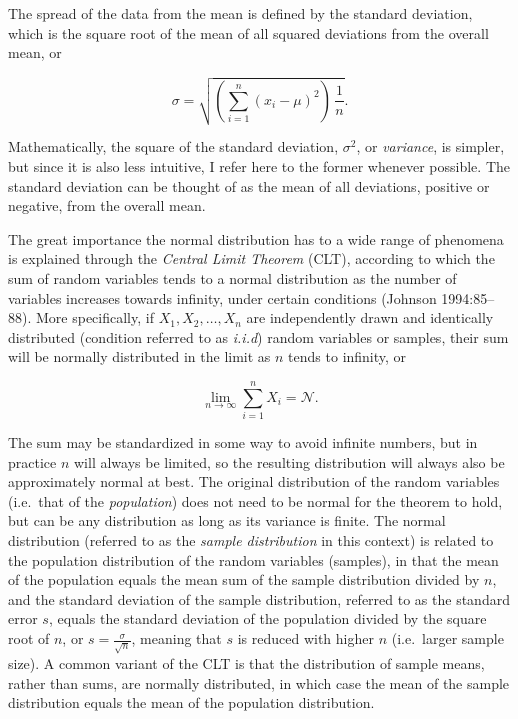 \documentclass[
  12pt,
]{book}
\begin{document}
The spread of the data from the mean is defined by the standard deviation, which is the square root of the mean of all squared deviations from the overall mean, or

\begin{equation}
\sigma = \sqrt{(\sum_{i=1}^n(x_i-\mu)^2)\,\frac{1}{n}}.
\label{eq:sigma}
\end{equation}

Mathematically, the square of the standard deviation, \(\sigma^2\), or \emph{variance}, is simpler, but since it is also less intuitive, I refer here to the former whenever possible. The standard deviation can be thought of as the mean of all deviations, positive or negative, from the overall mean.

The great importance the normal distribution has to a wide range of phenomena is explained through the \emph{Central Limit Theorem} (CLT), according to which the sum of random variables tends to a normal distribution as the number of variables increases towards infinity, under certain conditions (Johnson 1994:85--88). More specifically, if \(X_1, X_2, \dots, X_n\) are independently drawn and identically distributed (condition referred to as \emph{i.i.d}) random variables or samples, their sum will be normally distributed in the limit as \(n\) tends to infinity, or

\begin{equation}
\lim\limits_{n \to \infty} \sum_{i=1}^n X_i = \mathcal{N}.
\label{eq:CLT}
\end{equation}

The sum may be standardized in some way to avoid infinite numbers, but in practice \(n\) will always be limited, so the resulting distribution will always also be approximately normal at best. The original distribution of the random variables (i.e.~that of the \emph{population}) does not need to be normal for the theorem to hold, but can be any distribution as long as its variance is finite. The normal distribution (referred to as the \emph{sample distribution} in this context) is related to the population distribution of the random variables (samples), in that the mean of the population equals the mean sum of the sample distribution divided by \(n\), and the standard deviation of the sample distribution, referred to as the standard error \(s\), equals the standard deviation of the population divided by the square root of \(n\), or \(s = \frac{\sigma}{\sqrt{n}}\), meaning that \(s\) is reduced with higher \(n\) (i.e.~larger sample size). A common variant of the CLT is that the distribution of sample means, rather than sums, are normally distributed, in which case the mean of the sample distribution equals the mean of the population distribution.
\end{document}
